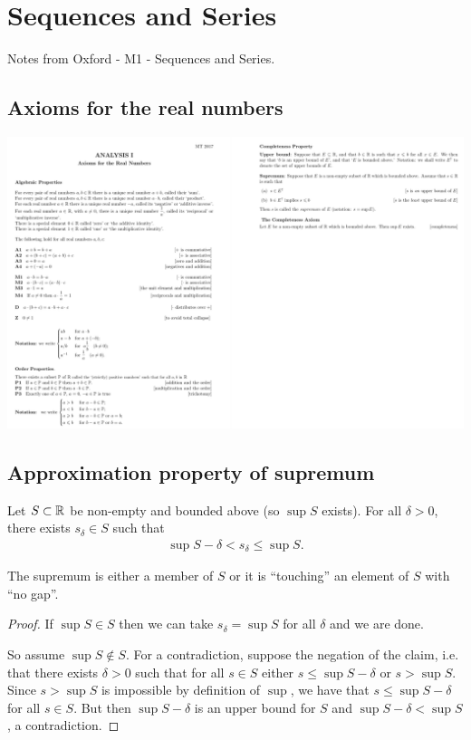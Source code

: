 \section{Sequences and Series}

Notes from Oxford - M1 - Sequences and Series.

\subsection{Axioms for the real numbers}
\begin{mdframed}
\includegraphics[width=400pt]{img/oxford-prelims-M2-analysis-I-axioms-for-real-numbers.png}
\end{mdframed}

\subsection{Approximation property of supremum}
\begin{theorem*}
  Let $S \subset \mathbb{R}$ be non-empty and bounded above (so $\sup S$ exists). For all $\delta > 0$,
  there exists $s_\delta \in S$ such that
  \begin{align*}
    \sup S - \delta < s_\delta \leq \sup S.
  \end{align*}
  \begin{intuition*}
    The supremum is either a member of $S$ or it is ``touching'' an element of $S$ with ``no gap''.
  \end{intuition*}
  \begin{proof}
    If $\sup S \in S$ then we can take $s_\delta = \sup S$ for all $\delta$ and we are done.

    So assume $\sup S \not\in S$. For a contradiction, suppose the negation of the claim, i.e. that
    there exists $\delta > 0$ such that for all $s \in S$ either $s \leq \sup S - \delta$ or
    $s > \sup S$. Since $s > \sup S$ is impossible by definition of $\sup$, we have that
    $s \leq \sup S - \delta$ for all $s \in S$. But then $\sup S - \delta$ is an upper bound for
    $S$ and $\sup S - \delta < \sup S$, a contradiction.
  \end{proof}
\end{theorem*}

